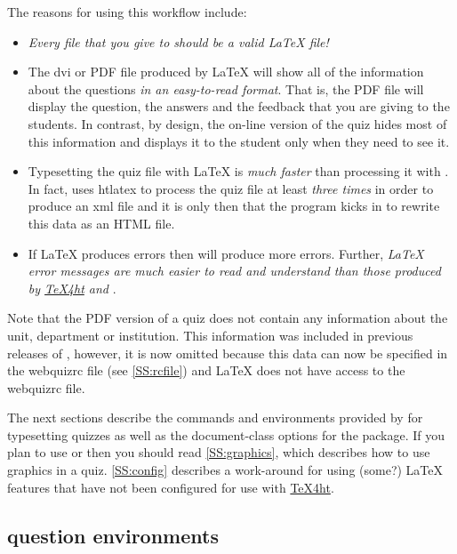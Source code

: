 \documentclass[svgnames]{article}
\newcommand\TeXfht{\href{https://www.ctan.org/tex4ht}{TeX4ht}\xspace}
\newcommand\webquizrc{\index{webquizrc}\textsf{webquizrc}\xspace}
\begin{document}
  The reasons for using this workflow include: \begin{itemize} \item
    \textit{Every file that you give to \WebQuiz should be a valid
    \LaTeX{} file!}

    \item The \textsf{dvi} or \textsf{PDF} file produced by \LaTeX{}
    will show all of the information about the questions
    \textit{in an easy-to-read format}. That is, the PDF file will
    display the question, the answers and the feedback that you are
    giving to the students. In contrast, by design, the on-line version
    of the quiz hides most of this information and displays it to the
    student only when they need to see it.

    \item Typesetting the quiz file with \LaTeX{} is \textit{much
    faster} than processing it with \WebQuiz. In fact, \WebQuiz uses
    \textsf{htlatex} to process the quiz file at least \textit{three times} in
    order to produce an \textsf{xml} file and it is only then that the
    \WebQuiz program kicks in to rewrite this data as an \textsf{HTML}
    file.

    \item If \LaTeX{} produces errors then \WebQuiz will produce more
    errors. Further, \textit{\LaTeX{} error messages are much easier to read and
    understand than those produced by \TeXfht and \WebQuiz}.
  \end{itemize}
  Note that the PDF version of a quiz does not contain any
  information about the unit, department or institution. This
  information was included in previous releases of \WebQuiz, however, it
  is now omitted because this data can now be specified in the \webquizrc
  file (see \autoref{SS:rcfile}) and \LaTeX{} does not have access to
  the \webquizrc file.

  The next sections describe the commands and environments provided by
  \WebQuiz for typesetting quizzes as well as the document-class options
  for the package. If you plan to use  or
   then you should read \autoref{SS:graphics}, which
  describes how to use graphics in a \WebQuiz quiz.
  \autoref{SS:config} describes a work-around for using (some?) \LaTeX{}
  features that have not been configured for use with \TeXfht.

\subsection{\WebQuiz question environments}
\end{document}

